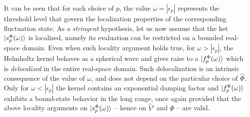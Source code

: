 \documentclass[reprint,aps,prb]{revtex4-1}
\renewcommand{\r}{{\bf r}}
\newcommand{\eps}{\epsilon}
\newcommand{\op}[1]{\hat {#1}}
\begin{document}
It can be seen that for each choice of $p$, the value $\omega = |\eps_p|$ represents the threshold level 
that govern the localization properties of the corresponding fluctuation state.
As a \emph{stringent} hypothesis, let us now assume that the ket $\ket{s_p^\Phi(\omega)}$ is localized, namely its evaluation can be
restricted on a bounded real-space domain.
Even when such locality argument holds true, for $\omega > |\eps_p|$, 
the Helmholtz kernel behaves as a spherical wave and  gives raise to a $\ket{f^\Phi_p(\omega)}$ which is \emph{delocalized} in the entire real-space domain.
Such delocalization is an intrinsic consequence of the value of $\omega$, and does not depend on the particular choice of 
$\op \Phi$.
Only for $\omega < |\eps_p|$ the kernel contains an exponential damping factor and $\ket{f^\Phi_p(\omega)}$ exhibits a bound-state behavior in the long range, 
once again provided that the above locality arguments on $\ket{s_p^\Phi(\omega)}$ -- hence on $\op V'$ and $\Phi$ -- are valid.
\end{document}
